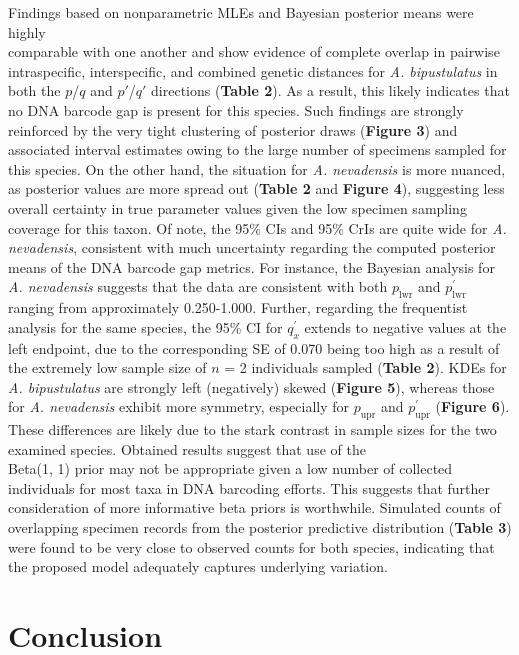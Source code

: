 \documentclass[12pt]{article}
\begin{document}
Findings based on nonparametric MLEs and Bayesian posterior means were highly \\ comparable with one another and show evidence of complete overlap in pairwise intraspecific, interspecific, and combined genetic distances for \textit{A. bipustulatus} in both the $p$/$q$ and $p'$/$q'$ directions (\textbf{Table 2}). As a result, this likely indicates that no DNA barcode gap is present for this species. Such findings are strongly reinforced by the very tight clustering of posterior draws (\textbf{Figure 3}) and associated interval estimates owing to the large number of specimens sampled for this species. On the other hand, the situation for \textit{A. nevadensis} is more nuanced, as posterior values are more spread out (\textbf{Table 2} and \textbf{Figure 4}), suggesting less overall certainty in true parameter values given the low specimen sampling coverage for this taxon. Of note, the 95\% CIs and 95\% CrIs are quite wide for \textit{A. nevadensis}, consistent with much uncertainty regarding the computed posterior means of the DNA barcode gap metrics. For instance, the Bayesian analysis for \textit{A. nevadensis} suggests that the data are consistent with both $p_{\mathrm{lwr}}$ and $p^{'}_{\mathrm{lwr}}$ ranging from approximately 0.250-1.000. Further, regarding the frequentist analysis for the same species, the 95\% CI for $q^{'}_x$ extends to negative values at the left endpoint, due to the corresponding SE of 0.070 being too high as a result of the extremely low sample size of $n$ = 2 individuals sampled (\textbf{Table 2}). KDEs for \textit{A. bipustulatus} are strongly left (negatively) skewed (\textbf{Figure 5}), whereas those for \textit{A. nevadensis} exhibit more symmetry, especially for $p_{\mathrm{upr}}$ and $p^{'}_{\mathrm{upr}}$ (\textbf{Figure 6}). These differences are likely due to the stark contrast in sample sizes for the two examined species. Obtained results suggest that use of the \\ Beta(1, 1) prior may not be appropriate given a low number of collected individuals for most taxa in DNA barcoding efforts. This suggests that further consideration of more informative beta priors is worthwhile. Simulated counts of overlapping specimen records from the posterior predictive distribution (\textbf{Table 3}) were found to be very close to observed counts for both species, indicating that the proposed model adequately captures underlying variation. 

\section{Conclusion}
\end{document}
